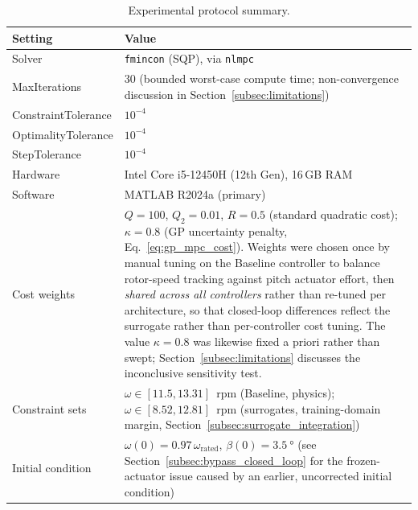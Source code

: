\begin{table}[H]
	\centering
	\caption{Experimental protocol summary.}
	\label{tab:protocol_summary}
	\small
	
	
	\begin{tabularx}{\textwidth}{
			>{\raggedright\arraybackslash}p{4cm}
			>{\raggedright\arraybackslash}X
		}
		\toprule
		Setting & Value \\
		\midrule
		
		Solver
		& \texttt{fmincon} (SQP), via \texttt{nlmpc} \\
		
		MaxIterations
		& $30$ (bounded worst-case compute time; non-convergence discussion in Section~\ref{subsec:limitations}) \\
		
		ConstraintTolerance
		& $10^{-4}$ \\
		
		OptimalityTolerance
		& $10^{-4}$ \\
		
		StepTolerance
		& $10^{-4}$ \\
		
		Hardware
		& Intel Core i5-12450H (12th Gen), 16\,GB RAM \\
		
		Software
		& MATLAB R2024a (primary) \\
		
		Cost weights
		& $Q=100$, $Q_2=0.01$, $R=0.5$ (standard quadratic cost);
		$\kappa=0.8$ (GP uncertainty penalty, Eq.~\ref{eq:gp_mpc_cost}).
		Weights were chosen once by manual tuning on the Baseline controller
		to balance rotor-speed tracking against pitch actuator effort, then
		\emph{shared across all controllers} rather than re-tuned per
		architecture, so that closed-loop differences reflect the surrogate
		rather than per-controller cost tuning. The value $\kappa=0.8$ was
		likewise fixed a priori rather than swept; Section~\ref{subsec:limitations}
		discusses the inconclusive sensitivity test. \\
		
		Constraint sets
		& $\omega\in[11.5,13.31]$~rpm (Baseline, physics);
		$\omega\in[8.52,12.81]$~rpm (surrogates, training-domain margin,
		Section~\ref{subsec:surrogate_integration}) \\
		
		Initial condition
		& $\omega(0)=0.97\,\omega_{\text{rated}}$,
		$\beta(0)=\SI{3.5}{\degree}$ (see Section~\ref{subsec:bypass_closed_loop}
		for the frozen-actuator issue caused by an earlier, uncorrected
		initial condition) \\
		

\end{tabularx}
\end{table}
